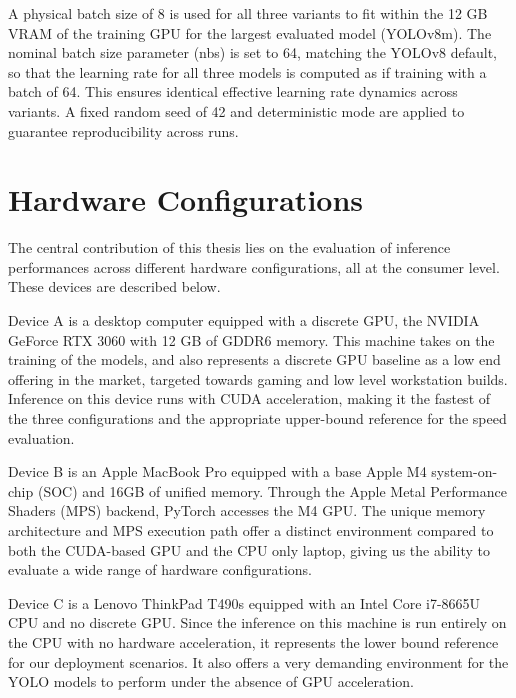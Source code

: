 A physical batch size of 8 is used for all three variants to fit within the 12 GB VRAM of the training GPU for the largest evaluated model (YOLOv8m). The nominal batch size parameter (nbs) is set to 64, matching the YOLOv8 default, so that the learning rate for all three models is computed as if training with a batch of 64. This ensures identical effective learning rate dynamics across variants. A fixed random seed of 42 and deterministic mode are applied to guarantee reproducibility across runs.

\section{Hardware Configurations}

The central contribution of this thesis lies on the evaluation of inference performances across different hardware configurations, all at the consumer level. These devices are described below.

Device A is a desktop computer equipped with a discrete GPU, the NVIDIA GeForce RTX 3060 with 12 GB of GDDR6 memory. This machine takes on the training of the models, and also represents a discrete GPU baseline as a low end offering in the market, targeted towards gaming and low level workstation builds. Inference on this device runs with CUDA acceleration, making it the fastest of the three configurations and the appropriate upper-bound reference for the speed evaluation.

Device B is an Apple MacBook Pro equipped with a base Apple M4 system-on-chip (SOC) and 16GB of unified memory. Through the Apple Metal Performance Shaders (MPS) backend, PyTorch accesses the M4 GPU. The unique memory architecture and MPS execution path offer a distinct environment compared to both the CUDA-based GPU and the CPU only laptop, giving us the ability to evaluate a wide range of hardware configurations.

Device C is a Lenovo ThinkPad T490s equipped with an Intel Core i7-8665U CPU and no discrete GPU. Since the inference on this machine is run entirely on the CPU with no hardware acceleration, it represents the lower bound reference for our deployment scenarios. It also offers a very demanding environment for the YOLO models to perform under the absence of GPU acceleration.

